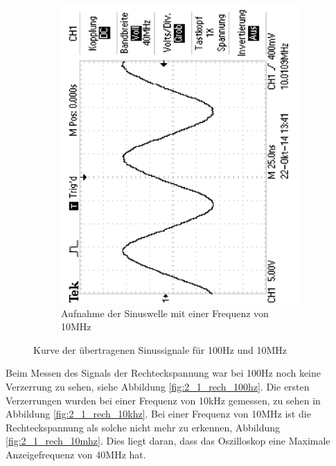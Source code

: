 \documentclass[12pt,a4paper]{article}
\begin{document}
\begin{figure}[H]
\begin{subfigure}[b]{0.48\textwidth}
                \includegraphics[width=\textwidth , scale = 0.4, angle = -90]{2_1_sin_10mhz.pdf}
                \caption[Aufnahme der Sinuswelle mit einer Frequenz von 10MHz]{Aufnahme der Sinuswelle mit einer Frequenz von 10MHz}
  				\label{fig:2_1_sin_10mhz}
        \end{subfigure}
        \caption{Kurve der übertragenen Sinussignale für 100Hz und 10MHz}
        \label{fig:2_1_sin_vergleich}
\end{figure}


Beim Messen des Signals der Rechteckspannung war bei 100Hz noch keine Verzerrung zu sehen, siehe Abbildung \ref{fig:2_1_rech_100hz}. Die ersten Verzerrungen wurden bei einer Frequenz von 10kHz gemessen, zu sehen in Abbildung \ref{fig:2_1_rech_10khz}. Bei einer Frequenz von 10MHz ist die Rechteckspannung als solche nicht mehr zu erkennen, Abbildung \ref{fig:2_1_rech_10mhz}. Dies liegt daran, dass das Oszilloskop eine Maximale Anzeigefrequenz von 40MHz hat.
\end{document}
